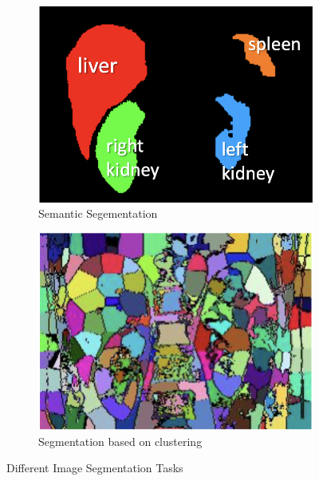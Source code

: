 \begin{figure}[htp]
    \centering
    \begin{subfigure}[b]{0.47\textwidth}
        \centering
        \includegraphics[width=\textwidth]{./figures/semantic-segmentation.png}
        \caption{Semantic Segementation}
        \label{fig:semantic-segmentation}
    \end{subfigure}
    \hfill
    \begin{subfigure}[b]{0.47\textwidth}
        \centering
        \includegraphics[width=\textwidth]{./figures/clustering.png}
        \caption{Segmentation based on clustering}
        \label{fig:normal-segmentation}
    \end{subfigure}
       \caption{Different Image Segmentation Tasks}
       \label{fig:segmentations}
\end{figure}

